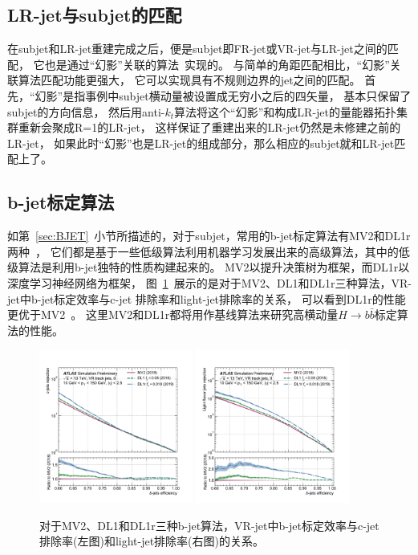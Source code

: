 \subsection{LR-jet与subjet的匹配}
\label{sec:XbbORMT}

在subjet和LR-jet重建完成之后，便是subjet即FR-jet或VR-jet与LR-jet之间的匹配，
它也是通过“幻影”关联的算法~\cite{Cacciari:2008gn}实现的。
与简单的角距匹配相比，“幻影”关联算法匹配功能更强大，
它可以实现具有不规则边界的jet之间的匹配。
首先，“幻影”是指事例中subjet横动量被设置成无穷小之后的四矢量，
基本只保留了subjet的方向信息，
然后用anti-$k_t$算法将这个“幻影”和构成LR-jet的量能器拓扑集群重新会聚成R=1的LR-jet，
这样保证了重建出来的LR-jet仍然是未修建之前的LR-jet，
如果此时“幻影”也是LR-jet的组成部分，那么相应的subjet就和LR-jet匹配上了。


\subsection{b-jet标定算法}
\label{sec:XbbORBJ}

如第~\ref{sec:BJET}~小节所描述的，对于subjet，常用的b-jet标定算法有MV2和DL1r两种~\cite{ATL-PHYS-PUB-2017-013,DLOR1,DLOR2}，
它们都是基于一些低级算法利用机器学习发展出来的高级算法，其中的低级算法是利用b-jet独特的性质构建起来的。
MV2以提升决策树为框架，而DL1r以深度学习神经网络为框架，
图~\ref{fig:VRDL1r}~展示的是对于MV2、DL1和DL1r三种算法，VR-jet中b-jet标定效率与c-jet
排除率和light-jet排除率的关系，
可以看到DL1r的性能更优于MV2~\cite{DLOR2}。
这里MV2和DL1r都将用作基线算法来研究高横动量$H\rightarrow b\bar{b}$标定算法的性能。

\begin{figure}  
  \begin{center}
    \includegraphics[width=0.45\textwidth]{figuresXbb/VRDL1r2.pdf}
    \includegraphics[width=0.45\textwidth]{figuresXbb/VRDL1r1.pdf}
  \end{center}
  \caption{
  对于MV2、DL1和DL1r三种b-jet算法，VR-jet中b-jet标定效率与c-jet排除率(左图)和light-jet排除率(右图)的关系。
   }
  \label{fig:VRDL1r}
\end{figure}

